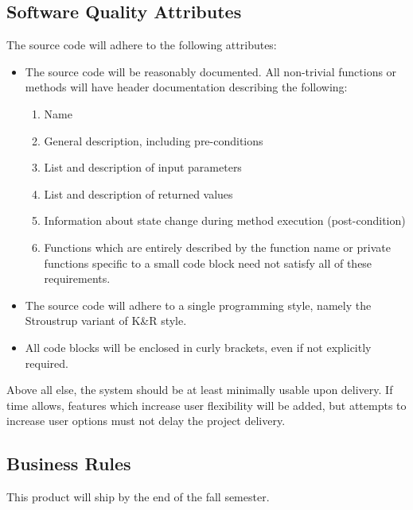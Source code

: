 \documentclass{article}
\begin{document}
\subsection{Software Quality Attributes}
The source code will adhere to the following attributes:
\begin{itemize}
    \item The source code will be reasonably documented.  All non-trivial functions or methods will have header documentation describing the following:
        \begin{enumerate}
            \item Name
            \item General description, including pre-conditions
            \item List and description of input parameters
            \item List and description of returned values
            \item Information about state change during method execution (post-condition)
            \item Functions which are entirely described by the function name or private functions specific to a small code block need not satisfy all of these requirements.
        \end{enumerate}
    \item The source code will adhere to a single programming style, namely the Stroustrup variant of K\&R style.
    \item All code blocks will be enclosed in curly brackets, even if not explicitly required.
\end{itemize}

Above all else, the system should be at least minimally usable upon delivery.
If time allows, features which increase user flexibility will be added, but attempts to increase user options must not delay the project delivery.

\subsection{Business Rules}
This product will ship by the end of the fall semester.
\end{document}
